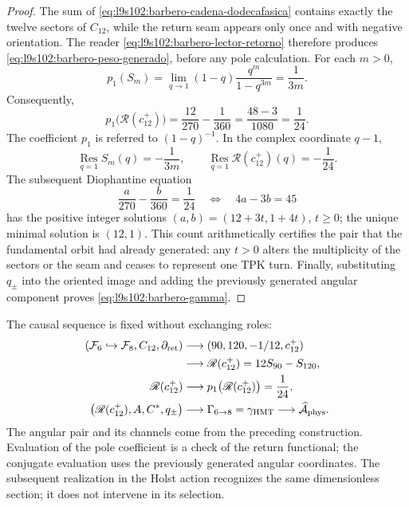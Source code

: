 \begin{proof}
The sum of \eqref{eq:l9s102:barbero-cadena-dodecafasica} contains exactly
the twelve sectors of \(C_{12}\), while the return seam appears
only once and with negative orientation. The reader
\eqref{eq:l9s102:barbero-lector-retorno} therefore produces
\eqref{eq:l9s102:barbero-peso-generado}, before any pole calculation. For
each \(m>0\),
\[
 p_1(S_m)
 =\lim_{q\to1}(1-q)\frac{q^m}{1-q^{3m}}
 =\frac1{3m}.
\]
Consequently,
\[
 p_1\bigl(\mathscr R(c_{12}^{+})\bigr)
 =\frac{12}{270}-\frac1{360}
 =\frac{48-3}{1080}=\frac1{24}.
\]
The coefficient \(p_1\) is referred to \((1-q)^{-1}\).
In the complex coordinate \(q-1\),
\[
 \operatorname*{Res}_{q=1}S_m(q)=-\frac1{3m},
 \qquad
 \operatorname*{Res}_{q=1}\mathscr R(c_{12}^{+})(q)=-\frac1{24}.
\]
The subsequent Diophantine equation
\[
 \frac a{270}-\frac b{360}=\frac1{24}
 \quad\Longleftrightarrow\quad 4a-3b=45
\]
has the positive integer solutions
\((a,b)=(12+3t,1+4t)\), \(t\ge0\); the unique minimal solution is
\((12,1)\). This count arithmetically certifies the pair that the fundamental
orbit had already generated: any \(t>0\) alters the multiplicity of
the sectors or the seam and ceases to represent one TPK turn.
Finally, substituting \(q_\pm\) into the oriented image and adding the previously generated
angular component proves \eqref{eq:l9s102:barbero-gamma}.
\end{proof}

The causal sequence is fixed without exchanging roles:
\begin{equation}
\begin{aligned}
 (\mathcal F_6\hookrightarrow\mathcal F_8,C_{12},\partial_{\rm ret})
 &\longrightarrow (90,120,-1/12,c_{12}^{+})\\
 &\longrightarrow \mathscr R(c_{12}^{+})=12S_{90}-S_{120},\\
 \mathscr R(c_{12}^{+})
 &\longrightarrow p_1\bigl(\mathscr R(c_{12}^{+})\bigr)=\frac1{24},\\
 \bigl(\mathscr R(c_{12}^{+}),A,C^*,q_\pm\bigr)
 &\longrightarrow \Gamma_{6\to8}=\gamma_{\rm HMT}
 \longrightarrow \widehat{\mathcal A}_{\rm phys}.
\end{aligned}
 \label{eq:l9s102:barbero-cadena-completa}
\end{equation}
The angular pair and its channels come from the preceding construction.
Evaluation of the pole coefficient is a check
of the return functional; the conjugate evaluation uses the
previously generated angular coordinates.
The subsequent realization in the Holst action recognizes the same dimensionless
section; it does not intervene in its selection.

